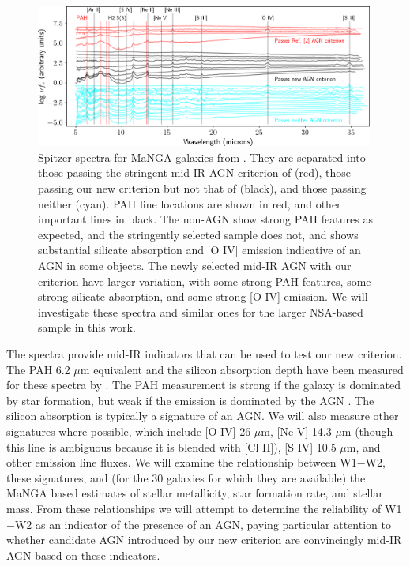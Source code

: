 \documentclass[12pt, preprint]{hacked-aastex}
\begin{document}
\begin{figure}[t!]
\includegraphics[width=0.99\textwidth]{all-spitzer.png}
    \caption{
\label{fig:spitzer} \small Spitzer spectra for MaNGA galaxies
from \cite{lambrides19a}. They are separated into those passing the
stringent mid-IR AGN criterion of \cite{assef18a} (red), those 
passing our new criterion but not that of \cite{assef18a} (black), and
those passing neither (cyan). PAH line locations are shown in
red, and other important lines in black. The non-AGN show
strong PAH features as expected, and the stringently selected sample
does not, and shows substantial silicate absorption and [O IV]
emission indicative of an AGN in some objects. The newly selected
mid-IR AGN with our criterion have larger variation, with some
strong PAH features, some strong silicate absorption, and some strong
[O IV] emission. We will investigate these spectra and similar
ones for the larger NSA-based sample in this work.}
\end{figure}

The spectra provide mid-IR indicators that can be used to test our new
criterion.  The PAH 6.2 $\mu$m equivalent and the silicon absorption
depth have been measured for these spectra by \cite{lambrides19a}.
The PAH measurement is strong if the galaxy is dominated by star
formation, but weak if the emission is dominated by the AGN
\cite{sajina22a}.  The silicon absorption is typically a signature of
an AGN.  We will also measure other signatures where possible, which
include [O IV] 26 $\mu$m, [Ne V] 14.3 $\mu$m (though this line is
ambiguous because it is blended with [Cl II]), [S IV] 10.5 $\mu$m, and
other emission line fluxes.  We will examine the relationship between
W1$-$W2, these signatures, and (for the 30 galaxies for which they are
available) the MaNGA based estimates of stellar metallicity, star
formation rate, and stellar mass. From these relationships we will
attempt to determine the reliability of W1$-$W2 as an indicator of the
presence of an AGN, paying particular attention to whether candidate
AGN introduced by our new criterion are convincingly mid-IR AGN based
on these indicators.
\end{document}
